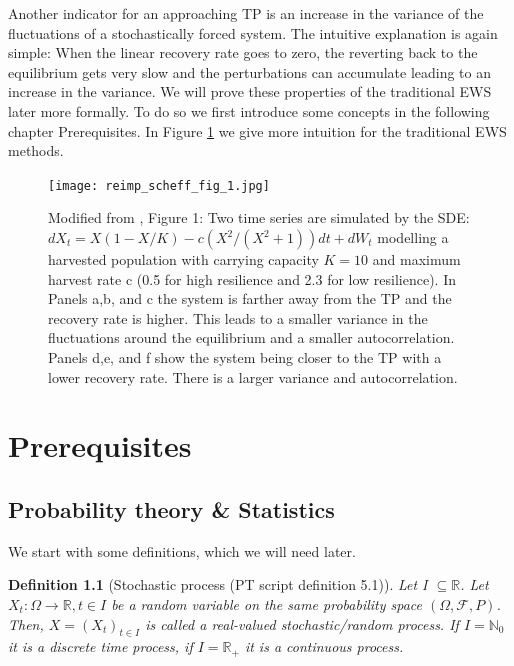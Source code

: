 \documentclass[%
thesis=student,%
coverpage=false,%
titlepage=false,%
headmarks=true, %
english,%
font=libertine, %
math=newpxtx, %
BCOR=5mm,%
coverBCOR=11mm%
]{tumbook}
\newtheorem{definition}{Definition}[section]
\begin{document}
Another indicator for an approaching TP is an increase in the variance of the fluctuations of a stochastically forced system. The intuitive explanation is again simple: When the linear recovery rate goes to zero, the reverting back to the equilibrium gets very slow and the perturbations can accumulate leading to an increase in the variance. 
We will prove these properties of the traditional EWS later more formally. To do so we first introduce some concepts in the following chapter Prerequisites. In Figure \ref{fig:scheffer_fig_1_reimp} we give more intuition for the traditional EWS methods. \\



\begin{figure}[h]
    \centering
    \texttt{[image: reimp\_scheff\_fig\_1.jpg]}
    \caption{Modified from \cite{Scheffer:2009}, Figure 1:
    Two time series are simulated by the SDE: $dX_{t}=X(1-X/K)-c(X^2/(X^2+1))dt + dW_{t}$ modelling a harvested population with carrying capacity $K = 10$ and maximum harvest rate c (0.5 for high resilience and 2.3 for low resilience). In Panels a,b, and c the system is farther away from the TP and the recovery rate is higher. This leads to a smaller variance in the fluctuations around the equilibrium and a smaller autocorrelation. Panels d,e, and f show the system being closer to the TP with a lower recovery rate. There is a larger variance and autocorrelation.}
    \label{fig:scheffer_fig_1_reimp}
\end{figure}



\chapter{Prerequisites}


\section{Probability theory \& Statistics}

We start with some definitions, which we will need later.

\begin{definition}[Stochastic process (PT script definition 5.1)]
Let I $\subseteq \mathbb{R}$. Let $X_{t}:\Omega \rightarrow \mathbb{R}, t \in I$ be a random variable on the same probability space $(\Omega,\mathcal{F},P)$. Then, $X = (X_{t})_{t \in I} $ is called a real-valued stochastic/random process. If $I = \mathbb{N}_{0}$ it is a discrete time process, if  $I = \mathbb{R}_{+}$ it is a continuous process.
\end{definition}
\end{document}

